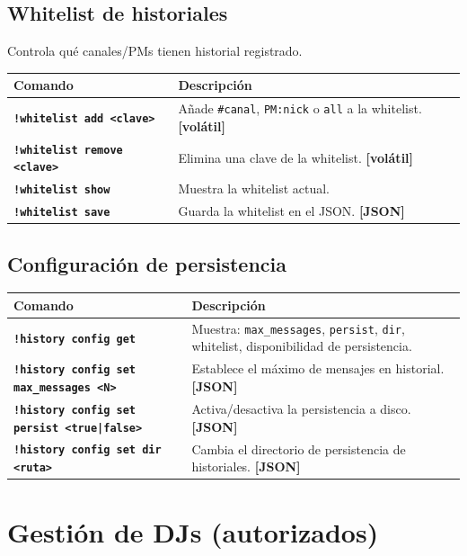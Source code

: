 \documentclass[a4paper,10pt]{article}
\newcommand{\cmd}[1]{\texttt{\color{cmdcolor}\bfseries #1}}
\newcommand{\param}[1]{\texttt{\color{paramcolor}<#1>}}
\newcommand{\persiste}{{\scriptsize\color{persistcolor}\textbf{[JSON]}}}
\newcommand{\volat}{{\scriptsize\color{volatilecolor}\textbf{[volátil]}}}
\begin{document}
\subsection{Whitelist de historiales}

Controla qué canales/PMs tienen historial registrado.

\begin{tabularx}{\textwidth}{lX}
\toprule
\textbf{Comando} & \textbf{Descripción} \\
\midrule
\cmd{!whitelist add \param{clave}} & Añade \texttt{\#canal}, \texttt{PM:nick} o \texttt{all} a la whitelist. \volat \\[0.3em]
\cmd{!whitelist remove \param{clave}} & Elimina una clave de la whitelist. \volat \\[0.3em]
\cmd{!whitelist show} & Muestra la whitelist actual. \\[0.3em]
\cmd{!whitelist save} & Guarda la whitelist en el JSON. \persiste \\
\bottomrule
\end{tabularx}

\subsection{Configuración de persistencia}

\begin{tabularx}{\textwidth}{lX}
\toprule
\textbf{Comando} & \textbf{Descripción} \\
\midrule
\cmd{!history config get} & Muestra: \texttt{max\_messages}, \texttt{persist}, \texttt{dir}, whitelist, disponibilidad de persistencia. \\[0.3em]
\cmd{!history config set max\_messages \param{N}} & Establece el máximo de mensajes en historial. \persiste \\[0.3em]
\cmd{!history config set persist \param{true|false}} & Activa/desactiva la persistencia a disco. \persiste \\[0.3em]
\cmd{!history config set dir \param{ruta}} & Cambia el directorio de persistencia de historiales. \persiste \\
\bottomrule
\end{tabularx}

\section{Gestión de DJs (autorizados)}
\end{document}
